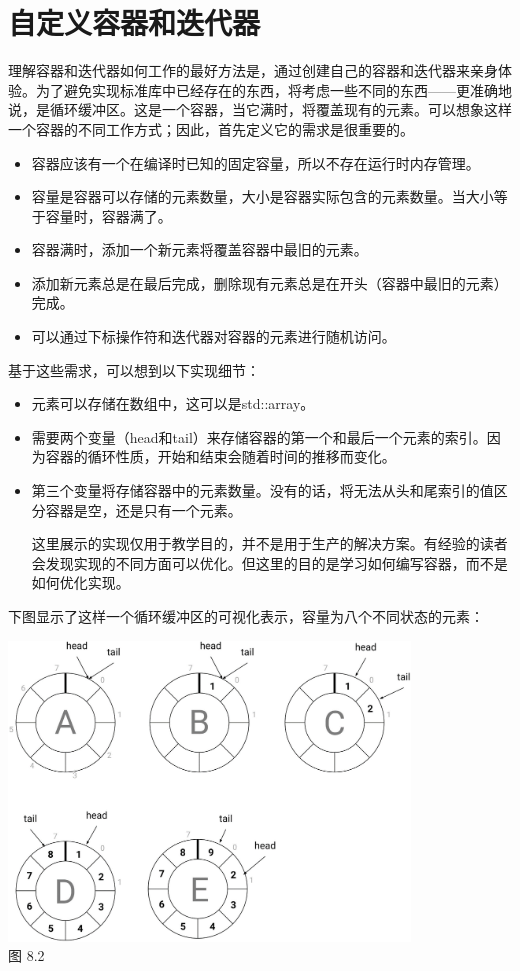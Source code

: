 \section{自定义容器和迭代器}

理解容器和迭代器如何工作的最好方法是，通过创建自己的容器和迭代器来亲身体验。为了避免实现标准库中已经存在的东西，将考虑一些不同的东西——更准确地说，是循环缓冲区。这是一个容器，当它满时，将覆盖现有的元素。可以想象这样一个容器的不同工作方式；因此，首先定义它的需求是很重要的。

\begin{itemize}
  \item 容器应该有一个在编译时已知的固定容量，所以不存在运行时内存管理。
  \item 容量是容器可以存储的元素数量，大小是容器实际包含的元素数量。当大小等于容量时，容器满了。
  \item 容器满时，添加一个新元素将覆盖容器中最旧的元素。
  \item 添加新元素总是在最后完成，删除现有元素总是在开头（容器中最旧的元素）完成。
  \item 可以通过下标操作符和迭代器对容器的元素进行随机访问。
\end{itemize}

基于这些需求，可以想到以下实现细节：

\begin{itemize}
  \item 元素可以存储在数组中，这可以是std::array。
  \item 需要两个变量（head和tail）来存储容器的第一个和最后一个元素的索引。因为容器的循环性质，开始和结束会随着时间的推移而变化。
  \item 第三个变量将存储容器中的元素数量。没有的话，将无法从头和尾索引的值区分容器是空，还是只有一个元素。

\begin{important}
这里展示的实现仅用于教学目的，并不是用于生产的解决方案。有经验的读者会发现实现的不同方面可以优化。但这里的目的是学习如何编写容器，而不是如何优化实现。
\end{important}

\end{itemize}

下图显示了这样一个循环缓冲区的可视化表示，容量为八个不同状态的元素：

\begin{center}
\includegraphics[width=0.8\textwidth]{images/2.png}\\
图 8.2
\end{center}

